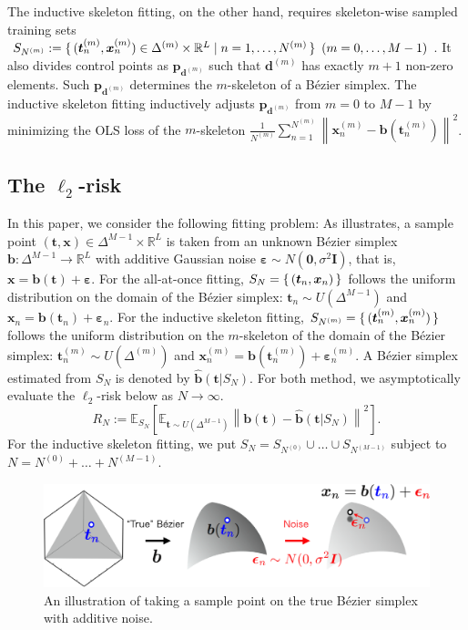\documentclass[letterpaper]{article} %
\theoremstyle{plain}
\newcommand{\norm}[1]{\left\| #1 \right\|}
\newcommand{\sqbra}[1]{\left[#1 \right]}
\newcommand{\R}{\mathbb{R}}
\newcommand{\E}{\mathbb{E}}
\begin{document}
The inductive skeleton fitting, on the other hand, requires skeleton-wise sampled training sets $S_{N^{(m)}} := \set{(\bm t^{(m)}_n, \bm x^{(m)}_n) \in \Delta^{(m)} \times \R^L | n = 1, \dots, N^{(m)}}~(m = 0, \dots, M - 1)$.
It also divides control points as $\bm p_{\bm d^{(m)}}$ such that $\bm d^{(m)}$ has exactly $m + 1$ non-zero elements.
Such $\bm p_{\bm d^{(m)}}$ determines the $m$-skeleton of a B\'ezier simplex.
The inductive skeleton fitting inductively adjusts $\bm p_{\bm d^{(m)}}$ from $m = 0$ to $M - 1$ by minimizing the OLS loss of the $m$-skeleton $\frac{1}{N^{(m)}}\sum_{n=1}^{N^{(m)}} \norm{\bm x^{(m)}_n - \bm b(\bm t_n^{(m)})}^2$.


\subsection{The \texorpdfstring{$\ell_2$}{l2}-risk}
In this paper, we consider the following fitting problem: As  illustrates, a sample point $(\bm t, \bm x)\in \Delta^{M - 1} \times \R^L$ is taken from an unknown B\'ezier simplex $\bm b: \Delta^{M - 1} \to \R^L$ with additive Gaussian noise $\bm \varepsilon \sim N(\bm 0, \sigma^2 \bm I)$, that is, $\bm x = \bm b(\bm t) + \bm \varepsilon$.
For the all-at-once fitting, $S_N = \set{(\bm t_n, \bm x_n)}$ follows the uniform distribution on the domain of the B\'ezier simplex: $\bm t_n \sim U(\Delta^{M - 1})$ and $\bm x_n = \bm b(\bm t_n) + \bm \varepsilon_n$.
For the inductive skeleton fitting, $S_{N^{(m)}} = \set{(\bm t_n^{(m)}, \bm x_n^{(m)})}$ follows the uniform distribution on the $m$-skeleton of the domain of the B\'ezier simplex: $\bm t_n^{(m)} \sim U(\Delta^{(m)})$ and $\bm x_n^{(m)} = \bm b(\bm t_n^{(m)}) + \bm \varepsilon_n^{(m)}$.
A B\'ezier simplex estimated from $S_N$ is denoted by $\bm{\hat b}(\bm t | S_N)$.
For both method, we asymptotically evaluate the $\ell_2$-risk below as $N \to \infty$.
\begin{equation}\label{def:risk}
    R_N := \E_{S_N}\sqbra{\E_{\bm t \sim U(\Delta^{M - 1})} \norm{\bm b(\bm t) - \hat{\bm b}(\bm t | S_N)}^2}.
\end{equation}
For the inductive skeleton fitting, we put $S_N = S_{N^{(0)}} \cup \dots \cup S_{N^{(M - 1)}}$ subject to $N = N^{(0)} + \dots + N^{(M - 1)}$.

\begin{figure}[ht]
    \centering
    \includegraphics[width=1\hsize]{sampling.png}
    \caption{An illustration of taking a sample point on the true B\'ezier simplex with additive noise.}\label{fig:sampling}
\end{figure}
\end{document}
